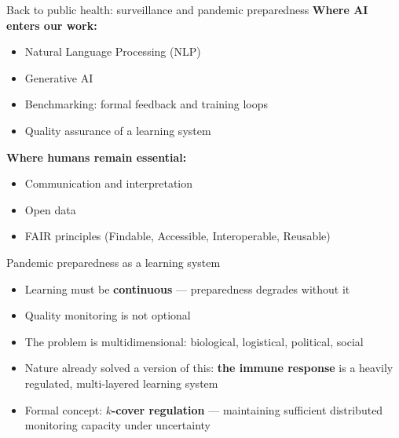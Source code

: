 \documentclass[aspectratio=169]{beamer}
\begin{document}
\begin{frame}{Back to public health: surveillance and pandemic preparedness}
  \textbf{Where AI enters our work:}
  \begin{itemize}
    \item Natural Language Processing (NLP)
    \item Generative AI
    \item Benchmarking: formal feedback and training loops
    \item Quality assurance of a learning system
  \end{itemize}

  \vspace{0.5em}
  \textbf{Where humans remain essential:}
  \begin{itemize}
    \item Communication and interpretation
    \item Open data
    \item FAIR principles (Findable, Accessible, Interoperable, Reusable)
  \end{itemize}
\end{frame}

\begin{frame}{Pandemic preparedness as a learning system}
  \begin{itemize}
    \item Learning must be \textbf{continuous} --- preparedness degrades
          without it
    \item Quality monitoring is not optional
    \item The problem is multidimensional: biological, logistical, political,
          social
    \item Nature already solved a version of this: \textbf{the immune response}
          is a heavily regulated, multi-layered learning system
    \item Formal concept: \textbf{$k$-cover regulation} --- maintaining
          sufficient distributed monitoring capacity under uncertainty
  \end{itemize}
\end{frame}
\end{document}
